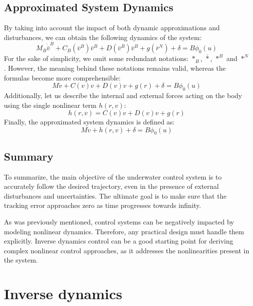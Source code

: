     \subsection{Approximated System Dynamics}
    By taking into account the impact of both dynamic approximations 
    and disturbances, we can obtain the following dynamics of the 
    system:
    \begin{equation}
        M_B \dot{\bar{v}}^B + C_B(\bar{v}^B) \bar{v}^B+D(\bar{v}^B) \bar{v}^B+g(\bar{r}^N)
         + \delta = B\phi_0(u)
    \end{equation}
    For the sake of simplicity, we omit some redundant notations: $*_B$, $\bar *$, $*^B$ and $*^N$. 
    However, the meaning behind these notations remains valid, 
    whereas the formulas become more comprehensible:
    \begin{equation}
        M \dot{v} + C(v)v + D(v)v + g(r) + \delta = B\phi_0(u)
    \end{equation}
    Additionally, let us describe the internal and external forces acting on the 
    body using the single nonlinear term $h(r,v)$:
    \begin{equation}
        h(r,v) = C(v)v + D(v)v + g(r)
    \end{equation}
    Finally, the approximated system dynamics is defined as:
    \begin{equation}
        M \dot{v} + h(r, v) + \delta = B\phi_0(u)
        \label{eqn::apprx_dynamics}
    \end{equation}

\subsection{Summary}
    To summarize, the main objective of the underwater control system is to accurately 
    follow the desired trajectory, even in the presence of external disturbances 
    and uncertainties. The ultimate goal is to make sure that the tracking error 
    approaches zero as time progresses towards infinity.

    As was previously mentioned, control systems can be negatively impacted 
    by modeling nonlinear dynamics. Therefore, any practical design must handle them explicitly. 
    Inverse dynamics control can be a good starting point for deriving complex nonlinear 
    control approaches, as it addresses the nonlinearities present in the system.

\section{Inverse dynamics}

